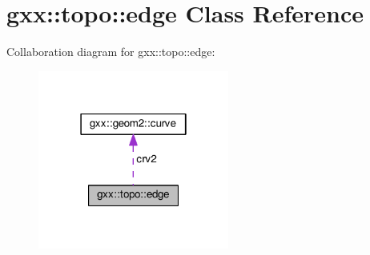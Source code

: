 \hypertarget{classgxx_1_1topo_1_1edge}{}\section{gxx\+:\+:topo\+:\+:edge Class Reference}
\label{classgxx_1_1topo_1_1edge}


Collaboration diagram for gxx\+:\+:topo\+:\+:edge\+:
\nopagebreak
\begin{figure}[H]
\begin{center}
\leavevmode
\includegraphics[width=178pt]{classgxx_1_1topo_1_1edge__coll__graph}
\end{center}
\end{figure}
